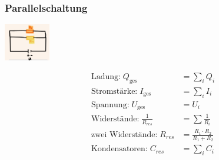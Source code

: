     \subsubsection{Parallelschaltung}
        \vspace{-1mm}
        \begin{minipage}{0.39\linewidth}
            \begin{footnotesize}
                \begin{center}
                    \vspace{2mm}
                    \includegraphics[width = 20mm]{src/images/parallelschaltung.png}
                \end{center}
            \end{footnotesize}
        \end{minipage}
        \begin{minipage}{0.6\linewidth}
            \begin{scriptsize}
                \begin{center}
                    \begin{align*}
                        \text{Ladung:} \; Q_{\text{ges}} &= \sum\limits_i Q_i\\
                        \text{Stromstärke:} \; I_{\text{ges}} &= \sum\limits_i I_i\\
                        \text{Spannung:} \; U_{\text{ges}} &= U_i\\
                        \text{Widerstände:} \; \frac{1}{R_{res}} &= \sum \frac{1}{R_i}\\
                        \text{zwei Widerstände:} \; R_{res} &= \frac{R_1 \cdot R_2}{R_1 + R_2}\\
                        \text{Kondensatoren:} \; C_{res} &= \sum\limits_i C_i
                    \end{align*}
                \end{center}
            \end{scriptsize}
        \end{minipage}